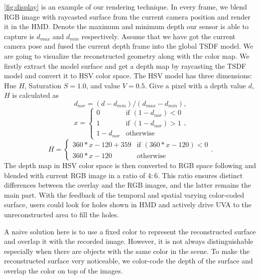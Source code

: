\documentclass[journal]{IEEEtran}
\begin{document}
\autoref{fig:display} is an example of our rendering technique. 
In every frame, we blend RGB image with raycasted surface from the 
current camera position and render it in the HMD. 
Denote the maximum and minimum depth our sensor is able to capture is $d_{max}$ and $d_{min}$ respectively.
Assume that we have got the current camera pose and fused the current depth frame into the global TSDF model.
We are going to visualize the reconstructed geometry along with the color map.
We firstly extract the model surface and get a depth map by raycasting the TSDF model 
and convert it to HSV color space.
The HSV model has three dimensions: Hue $H$, Saturation $S=1.0$, and value $V=0.5$.
Give a pixel with a depth value $d$, $H$ is calculated as
\begin{equation}
  d_{nor} = (d-d_{min}) / (d_{max}-d_{min}),
\end{equation}
\begin{equation}
  x =
  \begin{cases}
  0 & \mbox{if $(1-d_{nor})<0$}  \\
  1 & \mbox{if $(1-d_{nor})>1$}  \\
  1-d_{nor} & \mbox{otherwise}
  \end{cases},
  \end{equation}
\begin{equation}
  H = 
  \begin{cases}
    360 * x - 120 + 359 & \mbox{if $(360 * x - 120)<0$}  \\
    360 * x - 120 & \mbox{otherwise}
  \end{cases}.
\end{equation}
The depth map in HSV color space is then converted to RGB space following 
\cite{Smith:1978:CGT:965139.807361} and blended with current RGB image in a ratio of $4:6$. 
This ratio ensures distinct differences between the overlay and the RGB images, and the latter remains 
the main part. 
With the feedback of the temporal and spatial varying color-coded surface, users could look for holes shown in HMD 
and actively drive UVA to the unreconstructed area to fill the holes. 

A naive solution here is to use a fixed color to represent the reconstructed surface and overlap it with the recorded image. 
However, it is not always distinguishable especially when there are objects with the same color in the scene. 
To make the reconstructed surface very noticeable, we color-code the depth of the surface and 
overlap the color on top of the images. 
\end{document}

